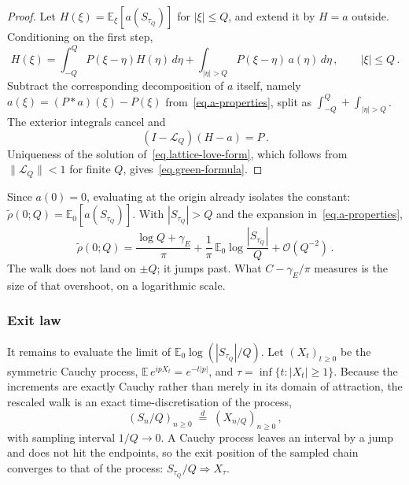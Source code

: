 \documentclass[11pt,a4paper]{article}
\theoremstyle{definition}
\begin{document}
\begin{proof}
Let $H(\xi) = \mathbb{E}_\xi[a(S_{\tau_Q})]$ for $|\xi|\leq Q$, and extend it by
$H = a$ outside.  Conditioning on the first step,
\begin{equation}
  H(\xi) = \int_{-Q}^{Q}P(\xi-\eta)H(\eta)\,d\eta
  + \int_{|\eta|>Q}P(\xi-\eta)\,a(\eta)\,d\eta\,,
  \qquad |\xi| \leq Q\,.
\end{equation}
Subtract the corresponding decomposition of $a$ itself, namely
$a(\xi) = (P*a)(\xi) - P(\xi)$ from~\eqref{eq.a-properties}, split as
$\int_{-Q}^{Q} + \int_{|\eta|>Q}$.  The exterior integrals cancel and
\begin{equation}
  (I-\mathcal{L}_Q)(H - a) = P\,.
\end{equation}
Uniqueness of the solution of~\eqref{eq.lattice-love-form}, which follows from
$\|\mathcal{L}_Q\| < 1$ for finite $Q$, gives~\eqref{eq.green-formula}.
\end{proof}

Since $a(0) = 0$, evaluating at the origin already isolates the constant:
$\tilde\rho(0;Q) = \mathbb{E}_0[a(S_{\tau_Q})]$.  With $|S_{\tau_Q}| > Q$ and
the expansion in~\eqref{eq.a-properties},
\begin{equation}\label{eq.rho0-exit}
  \tilde\rho(0;Q)
  = \frac{\log Q + \gamma_E}{\pi}
  + \frac{1}{\pi}\,\mathbb{E}_0\log\frac{|S_{\tau_Q}|}{Q}
  + \mathcal O(Q^{-2})\,.
\end{equation}
The walk does not land on $\pm Q$; it jumps past.  What $C - \gamma_E/\pi$
measures is the size of that overshoot, on a logarithmic scale.

\subsubsection{Exit law}
\label{sec.exit-law}

It remains to evaluate the limit of $\mathbb{E}_0\log(|S_{\tau_Q}|/Q)$.  Let
$(X_t)_{t\geq0}$ be the symmetric Cauchy process, $\mathbb{E}\,e^{ipX_t} =
e^{-t|p|}$, and $\tau = \inf\{t : |X_t| \geq 1\}$.  Because the increments are
exactly Cauchy rather than merely in its domain of attraction, the rescaled walk
is an exact time-discretisation of the process,
\begin{equation}\label{eq.embedding}
  \left(S_n/Q\right)_{n\geq0}
  \;\stackrel{d}{=}\;
  \left(X_{n/Q}\right)_{n\geq0}\,,
\end{equation}
with sampling interval $1/Q \to 0$.  A Cauchy process leaves an interval by a
jump and does not hit the endpoints, so the exit position of the sampled chain
converges to that of the process: $S_{\tau_Q}/Q \Rightarrow X_\tau$.
\end{document}

